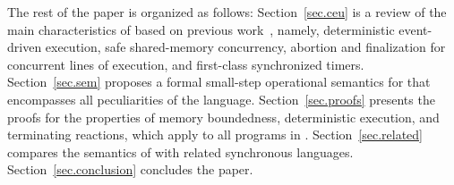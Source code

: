 The rest of the paper is organized as follows:
%
Section~\ref{sec.ceu} is a review of the main characteristics of \CEU based on
previous work~\cite{ceu.sensys13,ceu.tecs17}, namely, deterministic event-driven
execution, safe shared-memory concurrency, abortion and finalization for
concurrent lines of execution, and first-class synchronized timers.
%
Section~\ref{sec.sem} proposes a formal small-step operational semantics for
\CEU that encompasses all peculiarities of the language.
%
Section~\ref{sec.proofs} presents the proofs for the properties of memory
boundedness, deterministic execution, and terminating reactions, which apply
to all programs in \CEU.
%
Section~\ref{sec.related} compares the semantics of \CEU with related
synchronous languages.
%
Section~\ref{sec.conclusion} concludes the paper.


